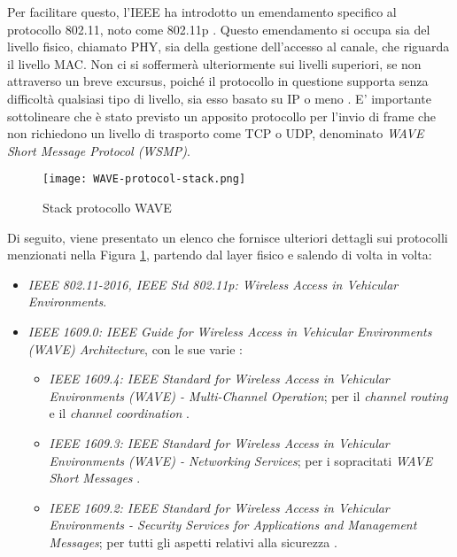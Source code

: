 Per facilitare questo, l'IEEE ha introdotto un emendamento specifico al protocollo 802.11, noto come 802.11p \cite{std2007wireless}. Questo emendamento si occupa sia del livello fisico, chiamato PHY, sia della gestione dell'accesso al canale, che riguarda il livello MAC. Non ci si soffermerà ulteriormente sui livelli superiori, se non attraverso un breve excursus, poiché il protocollo in questione supporta senza difficoltà qualsiasi tipo di livello, sia esso basato su IP o meno \cite{DSRC-Based-vehicular}. E' importante sottolineare che è stato previsto un apposito protocollo per l'invio di frame che non richiedono un livello di trasporto come TCP o UDP, denominato \textit{WAVE Short Message Protocol (WSMP)}.

\begin{figure}[h!]
    \centering
    \texttt{[image: WAVE-protocol-stack.png]}
    \caption{Stack protocollo WAVE}
    \label{fig:wave_stack}
\end{figure}

Di seguito, viene presentato un elenco che fornisce ulteriori dettagli sui protocolli menzionati nella Figura \ref{fig:wave_stack}, partendo dal layer fisico e salendo di volta in volta:

\begin{itemize}
    \item \textit{IEEE 802.11-2016, IEEE Std 802.11p: Wireless Access in Vehicular Environments}.
    \item \textit{IEEE 1609.0: IEEE Guide for Wireless Access in Vehicular Environments (WAVE) Architecture}, con le sue varie  \cite{8686445}: 
        \begin{itemize}
            \item \textit{IEEE 1609.4: IEEE Standard for Wireless Access in Vehicular Environments (WAVE) - Multi-Channel Operation}; per il \textit{channel routing} e il \textit{channel coordination} \cite{7435228}.
            \item \textit{IEEE 1609.3: IEEE Standard for Wireless Access in Vehicular Environments (WAVE) - Networking Services}; per i sopracitati \textit{WAVE Short Messages} \cite{9374154}.
            \item \textit{IEEE 1609.2: IEEE Standard for Wireless Access in Vehicular Environments - Security Services for Applications and Management Messages}; per tutti gli aspetti relativi alla sicurezza \cite{10075082}.
        \end{itemize}
\end{itemize}

